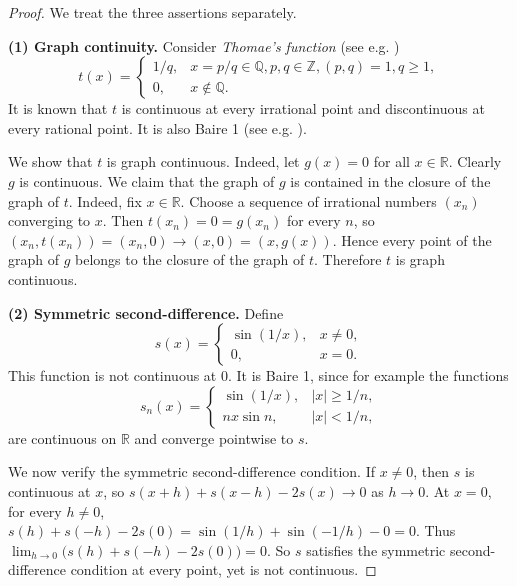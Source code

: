\documentclass[11pt]{amsart} %
\theoremstyle{definition}
\begin{document}
\begin{proof}
We treat the three assertions separately.

\medskip
\noindent
\textbf{(1) Graph continuity.}
Consider \emph{Thomae's function} (see e.g. \cite{24})
\begin{equation} 
 t(x)=
 \begin{cases}
 1/q,& x=p/q\in\mathbb Q, p,q\in \mathbb{Z}, (p,q)=1, q\ge 1,\\
 0,& x\notin\mathbb Q.
 \end{cases}
\end{equation} 
It is known that \(t\) is continuous at every irrational point and discontinuous at every rational point. It is also Baire 1 (see e.g. \cite{22}). 

We show that \(t\) is graph continuous. Indeed, let
$g(x)=0$ for all $x\in\mathbb R$. Clearly \(g\) is continuous. We claim that the graph of \(g\) is contained in the closure of the graph of \(t\). Indeed, fix \(x\in\mathbb R\). Choose a sequence of irrational numbers \((x_n)\) converging to \(x\). Then
$t(x_n)=0=g(x_n)$ 
for every \(n\), so
$(x_n,t(x_n))=(x_n,0)\to (x,0)=(x,g(x))$. 
Hence every point of the graph of \(g\) belongs to the closure of the graph of \(t\). Therefore \(t\) is graph continuous.

\medskip
\noindent
\textbf{(2) Symmetric second-difference.}
Define
\begin{equation} 
 s(x)=
 \begin{cases}
 \sin(1/x),& x\ne 0,\\
 0,& x=0.
 \end{cases}
\end{equation} 
This function is not continuous at \(0\). It is Baire 1, since for example the functions
\begin{equation} 
 s_n(x)=
 \begin{cases}
 \sin(1/x),& |x|\ge 1/n,\\
 n x\sin n,& |x|<1/n,
 \end{cases}
\end{equation} 
are continuous on \(\mathbb R\) and converge pointwise to \(s\).

We now verify the symmetric second-difference condition. If \(x\ne 0\), then \(s\) is continuous at \(x\), so $s(x+h)+s(x-h)-2s(x)\to 0$ as \(h\to 0\).
At \(x=0\), for every \(h\ne 0\),
$
 s(h)+s(-h)-2s(0)=\sin(1/h)+\sin(-1/h)-0=0.$
Thus
$
 \lim_{h\to 0}\bigl(s(h)+s(-h)-2s(0)\bigr)=0.$
So \(s\) satisfies the symmetric second-difference condition at every point, yet is not continuous.


\end{proof}
\end{document}
